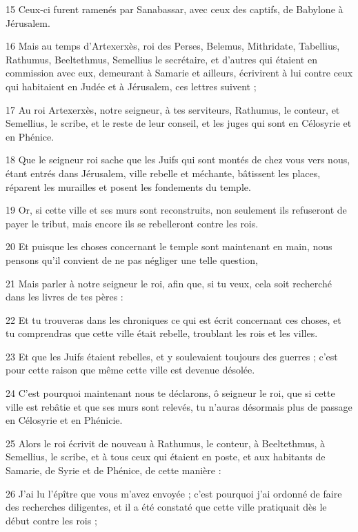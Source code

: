 \par 15 Ceux-ci furent ramenés par Sanabassar, avec ceux des captifs, de Babylone à Jérusalem.
\par 16 Mais au temps d'Artexerxès, roi des Perses, Belemus, Mithridate, Tabellius, Rathumus, Beeltethmus, Semellius le secrétaire, et d'autres qui étaient en commission avec eux, demeurant à Samarie et ailleurs, écrivirent à lui contre ceux qui habitaient en Judée et à Jérusalem, ces lettres suivent ;
\par 17 Au roi Artexerxès, notre seigneur, à tes serviteurs, Rathumus, le conteur, et Semellius, le scribe, et le reste de leur conseil, et les juges qui sont en Célosyrie et en Phénice.
\par 18 Que le seigneur roi sache que les Juifs qui sont montés de chez vous vers nous, étant entrés dans Jérusalem, ville rebelle et méchante, bâtissent les places, réparent les murailles et posent les fondements du temple.
\par 19 Or, si cette ville et ses murs sont reconstruits, non seulement ils refuseront de payer le tribut, mais encore ils se rebelleront contre les rois.
\par 20 Et puisque les choses concernant le temple sont maintenant en main, nous pensons qu'il convient de ne pas négliger une telle question,
\par 21 Mais parler à notre seigneur le roi, afin que, si tu veux, cela soit recherché dans les livres de tes pères :
\par 22 Et tu trouveras dans les chroniques ce qui est écrit concernant ces choses, et tu comprendras que cette ville était rebelle, troublant les rois et les villes.
\par 23 Et que les Juifs étaient rebelles, et y soulevaient toujours des guerres ; c'est pour cette raison que même cette ville est devenue désolée.
\par 24 C'est pourquoi maintenant nous te déclarons, ô seigneur le roi, que si cette ville est rebâtie et que ses murs sont relevés, tu n'auras désormais plus de passage en Célosyrie et en Phénicie.
\par 25 Alors le roi écrivit de nouveau à Rathumus, le conteur, à Beeltethmus, à Semellius, le scribe, et à tous ceux qui étaient en poste, et aux habitants de Samarie, de Syrie et de Phénice, de cette manière :
\par 26 J'ai lu l'épître que vous m'avez envoyée ; c'est pourquoi j'ai ordonné de faire des recherches diligentes, et il a été constaté que cette ville pratiquait dès le début contre les rois ;
